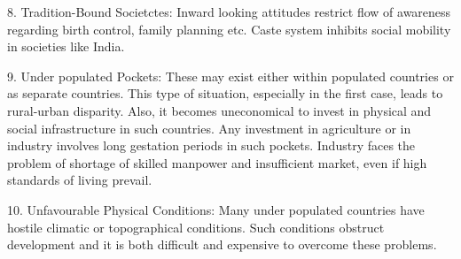 \documentclass[a4paper,12pt]{article}
\begin{document}
8. Tradition-Bound Societctes:
Inward looking attitudes restrict flow of awareness regarding birth control, family planning etc. Caste system inhibits social mobility in societies like India.

9. Under populated Pockets:
These may exist either within populated countries or as separate countries. This type of situation, especially in the first case, leads to rural-urban disparity. Also, it becomes uneconomical to invest in physical and social infrastructure in such countries. Any investment in agriculture or in industry involves long gestation periods in such pockets. Industry faces the problem of shortage of skilled manpower and insufficient market, even if high standards of living prevail.

10. Unfavourable Physical Conditions:
Many under populated countries have hostile climatic or topographical conditions. Such conditions obstruct development and it is both difficult and expensive to overcome these problems.
\newline
\end{document}
